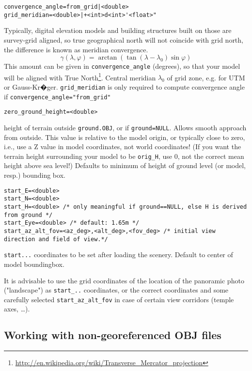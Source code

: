 \documentclass[a4paper]{article}
\newcommand{\filename}[1]{\texttt{#1}}
\begin{document}
\begin{verbatim}
convergence_angle=from_grid|<double> 
grid_meridian=<double>|+<int>d<int>'<float>"      
\end{verbatim}
Typically, digital elevation models and building structures built on those are survey-grid aligned, so true
geographical north will not coincide with grid north, the difference
is known as meridian convergence. 
\begin{equation}
\gamma(\lambda, \varphi)=\arctan(\tan(\lambda-\lambda_0)\sin\varphi)
\end{equation}
This amount can be given in \verb|convergence_angle|
(degrees), so that your model will be aligned with True North\footnote{%
\url{http://en.wikipedia.org/wiki/Transverse_Mercator_projection}}.
Central meridian $\lambda_0$ of grid zone, e.g. for UTM or Gauss-Kr�ger. 
\verb|grid_meridian| is  only required to compute convergence angle if \verb|convergence_angle="from_grid"|

\begin{verbatim}
zero_ground_height=<double> 
\end{verbatim}
height of terrain outside \filename{ground.OBJ}, or if \verb|ground=NULL|. Allows smooth
approach from outside.  This value is relative to the model origin, or
typically close to zero, i.e.,  use a Z value in model coordinates, not
world coordinates! (If you want the terrain height surrounding
your model to be \verb|orig_H|, use 0, not the correct mean height above sea
level!)  Defaults to minimum of height of ground level (or model, resp.)
bounding box.

\begin{verbatim}
start_E=<double> 
start_N=<double> 
start_H=<double> /* only meaningful if ground==NULL, else H is derived from ground */
start_Eye=<double> /* default: 1.65m */
start_az_alt_fov=<az_deg>,<alt_deg>,<fov_deg> /* initial view direction and field of view.*/
\end{verbatim}
\verb|start...| coordinates to be set after loading the scenery. Default to center of model boundingbox. 

It is advisable to use the grid coordinates of the location of the panoramic photo ("landscape") as \verb|start_..| coordinates, 
or the correct coordinates and some carefully selected \texttt{start\_az\_alt\_fov} in case of certain view corridors (temple axes, \ldots).


\subsection{Working with non-georeferenced OBJ files}
\label{sec:NonGeoreferenced}
\end{document}
